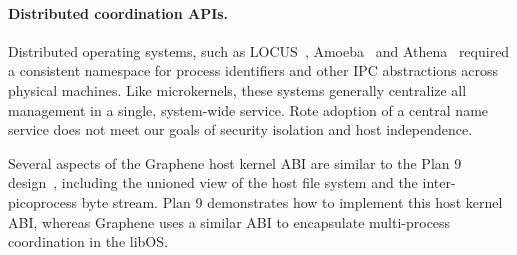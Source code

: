 \paragraph{Distributed coordination APIs.}
Distributed operating systems, such as LOCUS~\citep{locus83sosp,fleisch86locus}, Amoeba~\citep{mullender90amoeba,cheriton89naming} and  
Athena~\citep{champine90athena} required a consistent namespace for process identifiers and other IPC abstractions
across physical machines.
Like microkernels, these systems generally centralize all management in a single, system-wide service.
Rote adoption of a central name service does not meet our goals
of security isolation and host independence.

Several aspects of the Graphene host kernel ABI are similar to the
Plan 9 design~\citep{pike90plan9}, including the unioned view of the host file system
and the inter-picoprocess byte stream.
Plan 9 demonstrates how to implement this host kernel ABI,
whereas Graphene uses a similar ABI 
to encapsulate multi-process coordination 
in the libOS.





